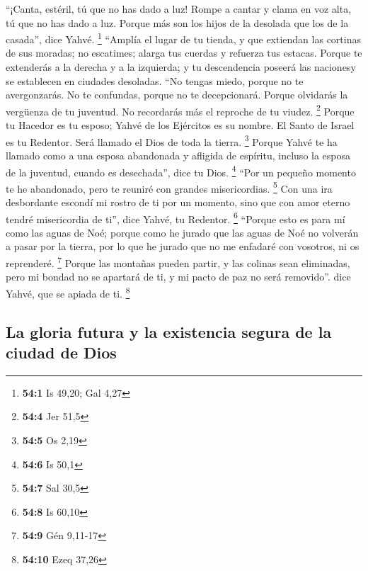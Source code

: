 \begin{paracol}{2}
 ``¡Canta, estéril, tú que no has dado a luz! Rompe a
cantar y clama en voz alta, tú que no has dado a luz. Porque más son los
hijos de la desolada que los de la casada'', dice Yahvé. \footnote{\textbf{54:1}
  Is 49,20; Gal 4,27}  ``Amplía el lugar de tu tienda, y
que extiendan las cortinas de sus moradas; no escatimes; alarga tus
cuerdas y refuerza tus estacas.  Porque te extenderás a la
derecha y a la izquierda; y tu descendencia poseerá las nacionesy se
establecen en ciudades desoladas.  ``No tengas miedo,
porque no te avergonzarás. No te confundas, porque no te decepcionará.
Porque olvidarás la vergüenza de tu juventud. No recordarás más el
reproche de tu viudez. \footnote{\textbf{54:4} Jer 51,5} 
Porque tu Hacedor es tu esposo; Yahvé de los Ejércitos es su nombre. El
Santo de Israel es tu Redentor. Será llamado el Dios de toda la tierra.
\footnote{\textbf{54:5} Os 2,19}  Porque Yahvé te ha
llamado como a una esposa abandonada y afligida de espíritu, incluso la
esposa de la juventud, cuando es desechada'', dice tu Dios. \footnote{\textbf{54:6}
  Is 50,1}  ``Por un pequeño momento te he abandonado,
pero te reuniré con grandes misericordias. \footnote{\textbf{54:7} Sal
  30,5}  Con una ira desbordante escondí mi rostro de ti
por un momento, sino que con amor eterno tendré misericordia de ti'',
dice Yahvé, tu Redentor. \footnote{\textbf{54:8} Is 60,10}
 ``Porque esto es para mí como las aguas de Noé; porque
como he jurado que las aguas de Noé no volverán a pasar por la tierra,
por lo que he jurado que no me enfadaré con vosotros, ni os reprenderé.
\footnote{\textbf{54:9} Gén 9,11-17}  Porque las montañas
pueden partir, y las colinas sean eliminadas, pero mi bondad no se
apartará de ti, y mi pacto de paz no será removido''. dice Yahvé, que se
apiada de ti. \footnote{\textbf{54:10} Ezeq 37,26}

\hypertarget{la-gloria-futura-y-la-existencia-segura-de-la-ciudad-de-dios}{%
\subsection{La gloria futura y la existencia segura de la ciudad de
Dios}\label{la-gloria-futura-y-la-existencia-segura-de-la-ciudad-de-dios}}


\end{paracol}
